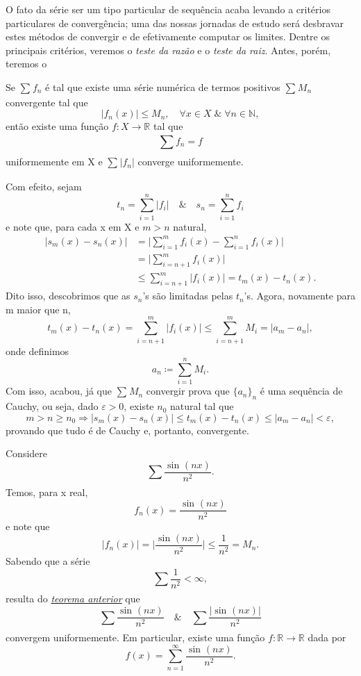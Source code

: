 \documentclass[../analysisII_notes.tex]{subfiles}
\begin{document}
O fato da série ser um tipo particular de sequência acaba levando a critérios particulares de convergência; uma das nossas jornadas de estudo será desbravar estes métodos de convergir e de efetivamente computar os limites. Dentre os principais critérios, veremos o \textit{teste da razão} e o \textit{teste da raiz}. Antes, porém, teremos o
\hypertarget{weierstrass_m}{
	\begin{theorem*}
		Se \(\sum\limits_{}^{}f_{n}\) é tal que existe uma série numérica de termos positivos \(\sum\limits_{}^{}M_{n}\) convergente tal que
		\[
			|f_{n}(x)|\leq M_{n},\quad \forall x\in X\;\&\; \forall n\in \mathbb{N},
		\]
		então existe uma função \(f:X\rightarrow \mathbb{R}\) tal que
		\[
			\sum\limits_{}^{}f_{n}=f
		\]
		uniformemente em X e \(\sum\limits_{}^{}|f_{n}|\) converge uniformemente.
	\end{theorem*}
}
\begin{proof*}
	Com efeito, sejam
	\[
		t_{n} = \sum\limits_{i=1}^{n}|f_{i}|\quad\&\quad s_{n} = \sum\limits_{i=1}^{n}f_{i}
	\]
	e note que, para cada x em X e \(m > n\) natural,
	\begin{align*}
		|s_{m}(x) - s_{n}(x)| & = \biggl\vert \sum\limits_{i=1}^{m}f_{i}(x) - \sum\limits_{i=1}^{n}f_{i}(x) \biggr\vert \\
		                      & = \biggl\vert \sum\limits_{i=n+1}^{m}f_{i}(x) \biggr\vert                               \\
		                      & \leq \sum\limits_{i=n+1}^{m}|f_{i}(x)| = t_{m}(x) - t_{n}(x).
	\end{align*}
	Dito isso, descobrimos que as \(s_{n}\)'s são limitadas pelas \(t_{n}\)'s. Agora, novamente para m maior que n,
	\[
		t_{m}(x)-t_{n}(x) = \sum\limits_{i=n+1}^{m}|f_{i}(x)| \leq \sum\limits_{i=n+1}^{m}M_{i} = |a_{m} - a_{n}|,
	\]
	onde definimos
	\[
		a_{n}\coloneqq \sum\limits_{i=1}^{n}M_{i}.
	\]
	Com isso, acabou, já que \(\sum\limits_{}^{}M_{n}\) convergir prova que \(\{a_{n}\}_{n}\) é uma sequência de Cauchy, ou seja, dado \(\varepsilon  > 0\), existe \(n_{0}\) natural tal que
	\[
		m > n \geq n_{0} \Rightarrow  |s_{m}(x)-s_{n}(x)| \leq t_{m}(x)-t_{n}(x)\leq |a_{m}-a_{n}| < \varepsilon ,
	\]
	provando que tudo é de Cauchy e, portanto, convergente. \qedsymbol
\end{proof*}
\begin{example}
	Considere
	\[
		\sum\limits_{}^{}\frac{\sin^{}{(nx)}}{n^{2}}.
	\]
	Temos, para x real,
	\[
		f_{n}(x) = \frac{\sin^{}{(nx)}}{n^{2}}
	\]
	e note que
	\[
		|f_{n}(x)| = \biggl\vert \frac{\sin^{}{(nx)}}{n^{2}} \biggr\vert\leq \frac{1}{n^{2}} = M_{n}.
	\]
	Sabendo que a série
	\[
		\sum\limits_{}^{}\frac{1}{n^{2}}<\infty,
	\]
	resulta do \hyperlink{weierstrass_m}{\textit{teorema anterior}} que
	\[
		\sum\limits_{}^{}\frac{\sin^{}{(nx)}}{n^{2}} \quad\&\quad \sum\limits_{}^{}\frac{|\sin^{}{(nx)}|}{n^{2}}
	\]
	convergem uniformemente. Em particular, existe uma função \(f:\mathbb{R}\rightarrow \mathbb{R}\) dada por
	\[
		f(x) = \sum\limits_{n=1}^{\infty}\frac{\sin^{}{(nx)}}{n^{2}}.
	\]
\end{example}
\end{document}
